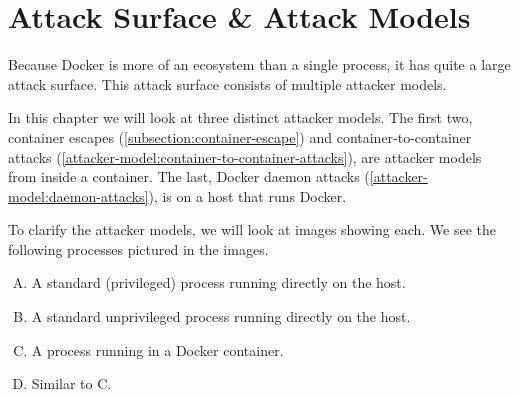 \chapter{Attack Surface \& Attack Models}\label{chapter:attack-surface-models}
Because Docker is more of an ecosystem than a single process, it has quite a large attack surface. This attack surface consists of multiple attacker models.

\medskip

In this chapter we will look at three distinct attacker models. The first two, container escapes (\autoref{subsection:container-escape}) and container-to-container attacks (\autoref{attacker-model:container-to-container-attacks}), are attacker models from inside a container. The last, Docker daemon attacks (\autoref{attacker-model:daemon-attacks}), is on a host that runs Docker.

\medskip

To clarify the attacker models, we will look at images showing each. We see the following processes pictured in the images.
\begin{enumerate}[A.]
    \item A standard (privileged) process running directly on the host.
    \item A standard unprivileged process running directly on the host.
    \item A process running in a Docker container.
    \item Similar to C.
\end{enumerate}




